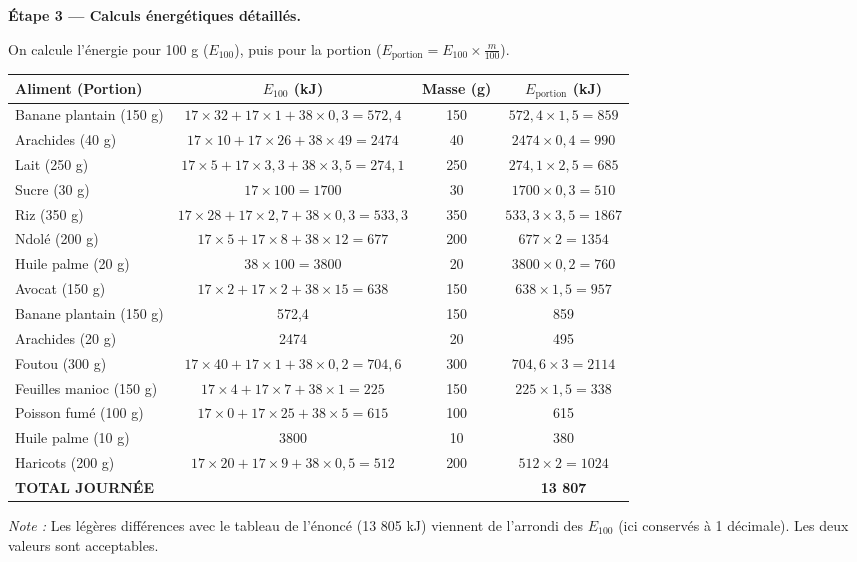 \documentclass[11pt]{article}
\begin{document}
\begin{exoresolu}
\textbf{Étape 3 — Calculs énergétiques détaillés.}

On calcule l'énergie pour 100 g ($E_{100}$), puis pour la portion ($E_{\text{portion}} = E_{100} \times \frac{m}{100}$).

\begin{center}
\small
\begin{tabularx}{\linewidth}{|X|c|c|c|}
\hline
\rowcolor{poporangeL} \textbf{Aliment (Portion)} & \textbf{$E_{100}$ (kJ)} & \textbf{Masse (g)} & \textbf{$E_{\text{portion}}$ (kJ)} \\
\hline
Banane plantain (150 g) & $17\times32 + 17\times1 + 38\times0,3 = 572,4$ & 150 & $572,4 \times 1,5 = 859$ \\
Arachides (40 g) & $17\times10 + 17\times26 + 38\times49 = 2474$ & 40 & $2474 \times 0,4 = 990$ \\
Lait (250 g) & $17\times5 + 17\times3,3 + 38\times3,5 = 274,1$ & 250 & $274,1 \times 2,5 = 685$ \\
Sucre (30 g) & $17\times100 = 1700$ & 30 & $1700 \times 0,3 = 510$ \\
\hline
Riz (350 g) & $17\times28 + 17\times2,7 + 38\times0,3 = 533,3$ & 350 & $533,3 \times 3,5 = 1867$ \\
Ndolé (200 g) & $17\times5 + 17\times8 + 38\times12 = 677$ & 200 & $677 \times 2 = 1354$ \\
Huile palme (20 g) & $38\times100 = 3800$ & 20 & $3800 \times 0,2 = 760$ \\
Avocat (150 g) & $17\times2 + 17\times2 + 38\times15 = 638$ & 150 & $638 \times 1,5 = 957$ \\
\hline
Banane plantain (150 g) & 572,4 & 150 & 859 \\
Arachides (20 g) & 2474 & 20 & 495 \\
\hline
Foutou (300 g) & $17\times40 + 17\times1 + 38\times0,2 = 704,6$ & 300 & $704,6 \times 3 = 2114$ \\
Feuilles manioc (150 g) & $17\times4 + 17\times7 + 38\times1 = 225$ & 150 & $225 \times 1,5 = 338$ \\
Poisson fumé (100 g) & $17\times0 + 17\times25 + 38\times5 = 615$ & 100 & 615 \\
Huile palme (10 g) & 3800 & 10 & 380 \\
Haricots (200 g) & $17\times20 + 17\times9 + 38\times0,5 = 512$ & 200 & $512 \times 2 = 1024$ \\
\hline
\textbf{TOTAL JOURNÉE} & & & \textbf{13 807} \\
\hline
\end{tabularx}
\end{center}
\emph{Note :} Les légères différences avec le tableau de l'énoncé (13 805 kJ) viennent de l'arrondi des $E_{100}$ (ici conservés à 1 décimale). Les deux valeurs sont acceptables.


\end{exoresolu}
\end{document}
